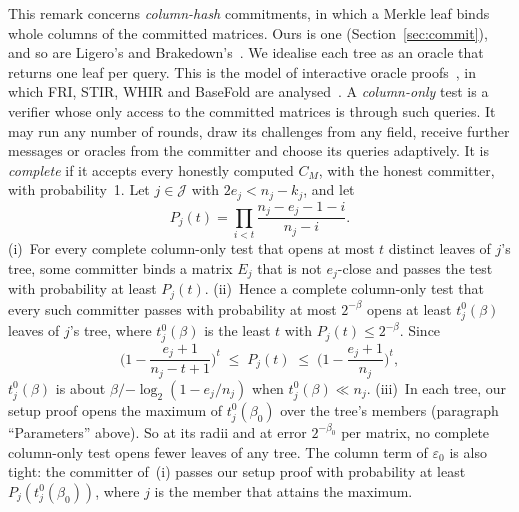 \begin{remark}
\label{rem:forced}
This remark concerns \emph{column-hash} commitments, in which a Merkle leaf binds whole columns of
the committed matrices. Ours is one (Section~\ref{sec:commit}), and so are Ligero's and
Brakedown's~\cite{ligero,brakedown}. We idealise each tree as an oracle that returns one leaf per
query. This is the model of interactive oracle proofs~\cite{bcs16}, in which FRI, STIR, WHIR and
BaseFold are analysed~\cite{fri2018,stir,whir,basefold}. A \emph{column-only} test is a verifier
whose only access to the committed matrices is through such queries. It may run any number of
rounds, draw its challenges from any field, receive further messages or oracles from the committer
and choose its queries adaptively. It is \emph{complete} if it accepts every honestly computed
$C_M$, with the honest committer, with probability~1. Let $j\in\mathcal J$ with $2e_j<n_j-k_j$, and let
\[
  P_j(t)=\prod_{i<t}\frac{n_j-e_j-1-i}{n_j-i}.
\]
(i)~For every complete column-only test that opens at most $t$ distinct leaves of $j$'s tree, some
committer binds a matrix $E_j$ that is not $e_j$-close and passes the test with probability at least
$P_j(t)$.
(ii)~Hence a complete column-only test that every such committer passes with probability at most
$2^{-\beta}$ opens at least $t^0_j(\beta)$ leaves of $j$'s tree, where $t^0_j(\beta)$ is the least $t$ with
$P_j(t)\le2^{-\beta}$. Since
\[
  \Big(1-\frac{e_j+1}{n_j-t+1}\Big)^{t}\;\le\;P_j(t)\;\le\;\Big(1-\frac{e_j+1}{n_j}\Big)^{t},
\]
$t^0_j(\beta)$ is about $\beta/{-\log_2(1-e_j/n_j)}$ when $t^0_j(\beta)\ll n_j$.
(iii)~In each tree, our setup proof opens the maximum of $t^0_j(\beta_0)$ over the tree's members
(paragraph ``Parameters'' above). So at its radii and at error $2^{-\beta_0}$ per matrix, no complete
column-only test opens fewer leaves of any tree. The column term of $\varepsilon_0$ is also tight:
the committer of~(i) passes our setup proof with probability at least $P_j(t^0_j(\beta_0))$, where
$j$ is the member that attains the maximum.
\end{remark}


